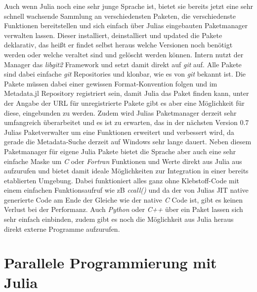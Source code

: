 \documentclass[proseminar,german,utf8]{zihpub}
\begin{document}
Auch wenn Julia noch eine sehr junge Sprache ist, bietet sie bereits jetzt eine sehr schnell wachsende Sammlung an verschiedensten Paketen, die verschiedenste Funktionen bereitstellen und sich einfach über Julias eingebauten Paketmanager verwalten lassen. Dieser installiert, deinstalliert und updated die Pakete deklarativ, das heißt er findet selbst heraus welche Versionen noch benötigt werden oder welche veraltet sind und gelöscht werden können. Intern nutzt der Manager das \textit{libgit2} Framework und setzt damit direkt auf \textit{git} auf. Alle Pakete sind dabei einfache \textit{git} Repositories und klonbar, wie es von \textit{git} bekannt ist. Die Pakete müssen dabei einer gewissen Format-Konvention folgen und im Metadata.jl Repository registriert sein, damit Julia das Paket finden kann, unter der Angabe der URL für unregistrierte Pakete gibt es aber eine Möglichkeit für diese, eingebunden zu werden. Zudem wird Julias Paketmanager derzeit sehr umfangreich überarbeitet und es ist zu erwarten, das in der nächsten Version 0.7 Julias Paketverwalter um eine Funktionen erweitert und verbessert wird, da gerade die Metadata-Suche derzeit auf Windows sehr lange dauert. Neben diesem Paketmanager für eigene Julia Pakete bietet die Sprache aber auch eine sehr einfache Maske um \textit{C} oder \textit{Fortran} Funktionen und Werte direkt aus Julia aus aufzurufen und bietet damit ideale Möglichkeiten zur Integration in einer bereits etablierten Umgebung. Dabei funktioniert alles ganz ohne Klebstoff-Code mit einem einfachen Funktionsaufruf wie zB \textit{ccall()} und da der von Julias JIT native generierte Code am Ende der Gleiche wie der native \textit{C} Code ist, gibt es keinen Verlust bei der Performanz. Auch \textit{Python} oder \textit{C++} über ein Paket lassen sich sehr einfach einbinden, zudem gibt es noch die Möglichkeit aus Julia heraus direkt externe Programme aufzurufen.

\section{Parallele Programmierung mit Julia}
\end{document}
